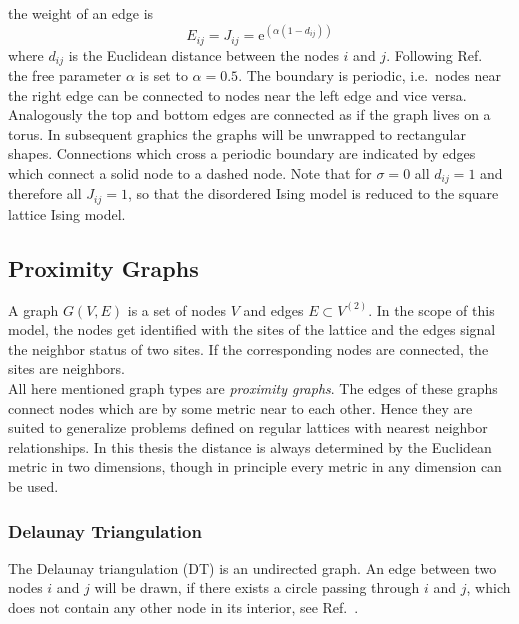 the weight of an edge is
\begin{equation}
    E_{ij} = J_{ij} = \mathrm{e}^{(\alpha (1-d_{ij}))}
    \label{eq:coupling}
\end{equation}
where \(d_{ij}\) is the Euclidean
distance between the nodes \(i\) and \(j\). Following Ref.\ \cite{Lima2000}
the free parameter \(\alpha\) is set to \(\alpha = 0.5\).
The boundary is periodic, i.e.\ nodes near the right edge can be
connected to nodes near the left edge and vice versa. Analogously the
top and bottom edges are connected as if the graph lives on a torus.
In subsequent graphics the graphs will be unwrapped to rectangular
shapes. Connections which cross a periodic boundary are indicated
by edges which connect a solid node to a dashed node.
Note that for \(\sigma = 0\) all \(d_{ij} = 1\) and therefore all
\(J_{ij} = 1\), so that the disordered Ising model is reduced to the
square lattice Ising model.

\subsection{Proximity Graphs}
\label{ssec:graphtypes}
    A graph \(G(V,E)\) is a set of nodes \(V\) and edges \(E \subset V^{(2)}\). In the
    scope of this model, the nodes get identified with the sites of the
    lattice and the edges signal the neighbor status of two sites. If the
    corresponding nodes are connected, the sites are neighbors.\\
    All here mentioned graph types are \emph{proximity graphs}.
    The edges of these graphs connect nodes which are by some metric near
    to each other.
    Hence they are suited to generalize problems defined on regular
    lattices with nearest neighbor relationships.
    In this thesis the distance is always determined by the Euclidean
    metric in two dimensions, though in principle every metric in any
    dimension can be used.\\

    \subsubsection{Delaunay Triangulation}
        The Delaunay triangulation (DT) is an undirected graph. An edge
        between two nodes \(i\) and \(j\) will be drawn, if there exists
        a circle passing through \(i\) and \(j\), which does not contain
        any other node in its interior, see Ref.\ \cite{Katajainen}.

